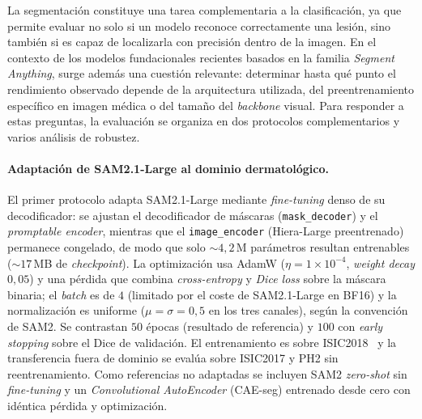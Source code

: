 La segmentación constituye una tarea complementaria a la
clasificación, ya que permite evaluar no solo si un modelo reconoce
correctamente una lesión, sino también si es capaz de localizarla
con precisión dentro de la imagen. En el contexto de los modelos
fundacionales recientes basados en la familia \emph{Segment
Anything}, surge además una cuestión relevante: determinar hasta qué
punto el rendimiento observado depende de la arquitectura utilizada,
del preentrenamiento específico en imagen médica o del tamaño del
\emph{backbone} visual. Para responder a estas preguntas, la
evaluación se organiza en dos protocolos complementarios y varios
análisis de robustez.

\paragraph{Adaptación de SAM2.1-Large al dominio dermatológico.}
El primer protocolo adapta SAM2.1-Large mediante \emph{fine-tuning}
denso de su decodificador: se ajustan el
decodificador de máscaras (\texttt{mask\_decoder}) y el
\emph{promptable encoder}, mientras que el \texttt{image\_encoder}
(Hiera-Large preentrenado) permanece congelado, de modo que solo
$\sim 4{,}2$\,M parámetros resultan entrenables ($\sim 17$\,MB de
\emph{checkpoint}). La optimización usa AdamW
($\eta = 1\times 10^{-4}$, \emph{weight decay} $0{,}05$) y una
pérdida que combina \emph{cross-entropy} y \emph{Dice loss} sobre la
máscara binaria; el \emph{batch} es de $4$ (limitado por el coste de
SAM2.1-Large en BF16) y la normalización es uniforme
($\mu = \sigma = 0{,}5$ en los tres canales), según la convención
de SAM2. Se contrastan $50$ épocas (resultado de referencia) y
$100$ con \emph{early stopping} sobre el Dice de validación. El
entrenamiento es sobre ISIC2018~\cite{isic2018} y la transferencia
fuera de dominio se evalúa sobre ISIC2017 y PH2 sin reentrenamiento.
Como referencias no adaptadas se incluyen SAM2 \emph{zero-shot} sin
\emph{fine-tuning} y un \emph{Convolutional AutoEncoder} (CAE-seg)
entrenado desde cero con idéntica pérdida y optimización.

